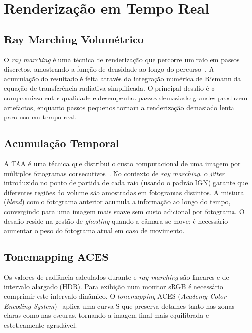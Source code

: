 \section{Renderização em Tempo Real}
\label{chap2:sec:tempoReal}

\subsection{Ray Marching Volumétrico}
\label{chap2:subsec:rm}

O \emph{ray marching} é uma técnica de renderização que percorre um raio em passos discretos, amostrando a função de densidade ao longo do percurso~\cite{schneider2015}. A acumulação do resultado é feita através da integração numérica de Riemann da equação de transferência radiativa simplificada. O principal desafio é o compromisso entre qualidade e desempenho: passos demasiado grandes produzem artefactos, enquanto passos pequenos tornam a renderização demasiado lenta para uso em tempo real.

\subsection{Acumulação Temporal}
\label{chap2:subsec:taa}

A \ac{TAA} é uma técnica que distribui o custo computacional de uma imagem por múltiplos fotogramas consecutivos~\cite{karis2014}. No contexto de \emph{ray marching}, o \emph{jitter} introduzido no ponto de partida de cada raio (usando o padrão \ac{IGN}) garante que diferentes regiões do volume são amostradas em fotogramas distintos. A mistura (\emph{blend}) com o fotograma anterior acumula a informação ao longo do tempo, convergindo para uma imagem mais suave sem custo adicional por fotograma. O desafio reside na gestão de \emph{ghosting} quando a câmara se move: é necessário aumentar o peso do fotograma atual em caso de movimento.

\subsection{Tonemapping ACES}
\label{chap2:subsec:aces}

Os valores de radiância calculados durante o \emph{ray marching} são lineares e de intervalo alargado (\ac{HDR}). Para exibição num monitor sRGB é necessário comprimir este intervalo dinâmico. O \emph{tonemapping} \ac{ACES} (\textit{Academy Color Encoding System})~\cite{narkowicz2016} aplica uma curva S que preserva detalhes tanto nas zonas claras como nas escuras, tornando a imagem final mais equilibrada e esteticamente agradável.

